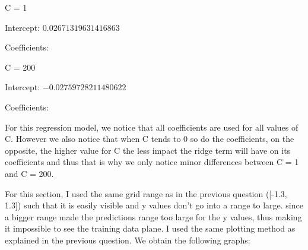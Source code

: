 \documentclass[10pt]{article}
\begin{document}
C = 1
\par
Intercept: $0.02671319631416863$
\par
Coefficients:
\begin{equation*}
    [0, 0.00897235, 0.93984335, 0.70409046, -0.05097339, 0.16709087
\end{equation*}
\begin{equation*}
    0.1100758, 0.09688451, -0.19635685, 0.07396169, 0.30812562, -0.04912464
\end{equation*}
\begin{equation*}
    -0.02268318, 0.05130517, -0.108326, -0.14242707, 0.06966072, 0.12227828
\end{equation*}
\begin{equation*}
    -0.16703029, 0.08436703, -0.04872375]
\end{equation*}

\vspace{5mm} %

C = 200
\par
Intercept: $-0.02759728211480622$
\par
Coefficients:
\begin{equation*}
    [ 0, -0.00662543, 0.99248296, 0.89984203, -0.14267824, 0.3603547
\end{equation*}
\begin{equation*}
    0.57425937, 0.07124828, -0.79767503, 0.00522424, 0.1531058, 0.01859584
\end{equation*}
\begin{equation*}
    -0.20079551, 0.17207762, -0.2688553, -0.65605953, 0.27619337, 0.37207688
\end{equation*}
\begin{equation*}
    -0.45549789, 0.64632594, -0.00373098]
\end{equation*}


For this regression model, we notice that all coefficients are used for all values of C. However we also
notice that when C tends to 0 so do the coefficients, on the opposite, the higher value for C the less impact
the ridge term will have on its coefficients and thus that is why we only notice minor differences between C = 1 and C = 200.

  
For this section, I used the same grid range as in the previous question ([-1.3, 1.3]) such that it is easily visible and
y values don't go into a range to large.
since a bigger range made the predictions range too large for the y values, thus making it 
impossible to see the training data plane. I used the same plotting method as explained
in the previous question. We obtain the following graphs:
\end{document}
